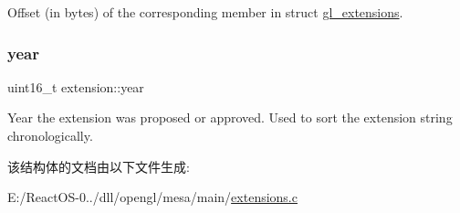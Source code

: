 Offset (in bytes) of the corresponding member in struct \hyperlink{structgl__extensions}{gl\+\_\+extensions}. \mbox{\label{structextension_a6998036f1113bb9eddfe6d447afb7574}} 
\subsubsection{\texorpdfstring{year}{year}}
{\footnotesize\ttfamily uint16\+\_\+t extension\+::year}

Year the extension was proposed or approved. Used to sort the extension string chronologically. 

该结构体的文档由以下文件生成\+:\begin{DoxyCompactItemize}
\item 
E\+:/\+React\+O\+S-\/0../dll/opengl/mesa/main/\hyperlink{opengl_2mesa_2main_2extensions_8c}{extensions.\+c}\end{DoxyCompactItemize}
